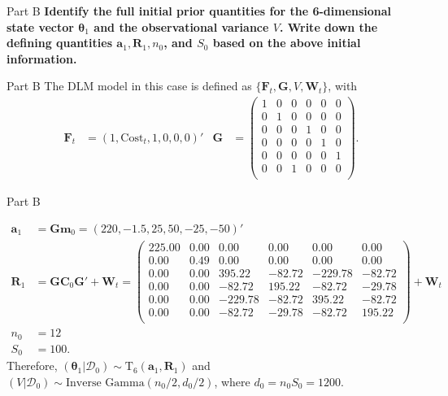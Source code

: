 \documentclass[14pt]{beamer}
\newcommand{\sD}{\mathcal{D}}
\newcommand{\bm}{\mathbf{m}}
\newcommand{\bC}{\mathbf{C}}
\newcommand{\btheta}{\boldsymbol{\theta}}
\newcommand{\bF}{\mathbf{F}}
\newcommand{\bG}{\mathbf{G}}
\newcommand{\bW}{\mathbf{W}}
\newcommand{\ba}{\mathbf{a}}
\newcommand{\bR}{\mathbf{R}}
\begin{document}
	\begin{frame}{Part B}
		\textbf{Identify the full initial prior quantities for the 6-dimensional state vector $\btheta_1$ and the observational variance $V$. Write down the defining quantities $\ba_1,\bR_1,n_0$, and $S_0$ based on the above initial information.}
	\end{frame}

	\begin{frame}{Part B}
		The DLM model in this case is defined as $\{ \bF_t, \bG,V,\bW_t \}$, with 
		\begin{align*}
		\bF_t & = (1,\text{Cost}_t,1,0,0,0)' &
		\bG & = \begin{pmatrix}
		1 & 0 & 0 & 0 & 0 & 0 \\
		0 & 1 & 0 & 0 & 0 & 0 \\
		0 & 0 & 0 & 1 & 0 & 0 \\
		0 & 0 & 0 & 0 & 1 & 0 \\
		0 & 0 & 0 & 0 & 0 & 1 \\
		0 & 0 & 1 & 0 & 0 & 0 \\
		\end{pmatrix}.
		\end{align*}
	\end{frame}

	\begin{frame}{Part B}
		
		{\scriptsize \begin{align*}
		\ba_1 & = \bG\bm_0 = (220,  -1.5,  25,  50, -25, -50)' \\
		\bR_1 & = \bG\bC_0\bG' + \bW_t = \begin{pmatrix}
		225.00 & 0.00 & 0.00 & 0.00 & 0.00 & 0.00 \\ 
		0.00 & 0.49 & 0.00 & 0.00 & 0.00 & 0.00 \\ 
		0.00 & 0.00 & 395.22 & -82.72 & -229.78 & -82.72 \\ 
		0.00 & 0.00 & -82.72 & 195.22 & -82.72 & -29.78 \\ 
		0.00 & 0.00 & -229.78 & -82.72 & 395.22 & -82.72 \\ 
		0.00 & 0.00 & -82.72 & -29.78 & -82.72 & 195.22 \\ 
		\end{pmatrix}  + \bW_t\\
		n_0 & = 12 \\
		S_0 & = 100.
		\end{align*}}
		Therefore, $(\btheta_1|\sD_0) \sim \text{T}_{6}(\ba_1,\bR_1)$ and $(V|\sD_0) \sim \text{Inverse Gamma}(n_0/2,d_0/2)$, where $d_0 = n_0S_0 = 1200$.
	\end{frame}
\end{document}
